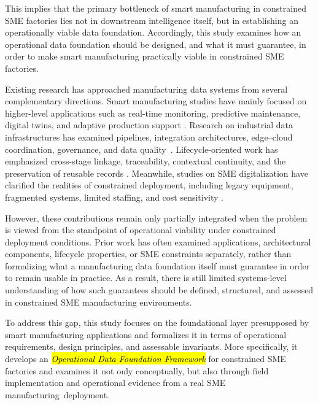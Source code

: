\documentclass[systems,article,accept,pdftex,moreauthors]{Definitions/mdpi}
\begin{document}
This implies that the primary bottleneck of smart manufacturing in constrained SME factories lies not in downstream intelligence itself, but in establishing an operationally viable data foundation. Accordingly, this study examines how an operational data foundation should be designed, and what it must guarantee, in order to make smart manufacturing practically viable in constrained SME factories.

Existing research has approached manufacturing data systems from several complementary directions. Smart manufacturing studies have mainly focused on higher-level applications such as real-time monitoring, predictive maintenance, digital twins, and adaptive production support \cite{song2025smart,tao2017digital,nguyen2025aidriven}. Research on industrial data infrastructures has examined pipelines, integration architectures, edge--cloud coordination, governance, and data \mbox{quality \cite{ismail2019manufacturing,raptis2019data,morris2020foundations}}. Lifecycle-oriented work has emphasized cross-stage linkage, traceability, contextual continuity, and the preservation of reusable records \cite{bernstein2018contextualising,hedberg2017lift,abdelaty2024conceptualizing,zhang2024digitalthread}. Meanwhile, studies on SME digitalization have clarified the realities of constrained deployment, including legacy equipment, fragmented systems, limited staffing, and cost sensitivity \cite{mittal2020adoption,ghobakhloo2019adoption,krishnan2024challenges,huang2025barriers}.

However, these contributions remain only partially integrated when the problem is viewed from the standpoint of operational viability under constrained deployment conditions. Prior work has often examined applications, architectural components, lifecycle properties, or SME constraints separately, rather than formalizing what a manufacturing data foundation itself must guarantee in order to remain usable in practice. As a result, there is still limited systems-level understanding of how such guarantees should be defined, structured, and assessed in constrained SME manufacturing environments.

To address this gap, this study focuses on the foundational layer presupposed by smart manufacturing applications and formalizes it in terms of operational requirements, design principles, and assessable invariants. More specifically, it develops an \emph{\hl{Operational Data Foundation Framework}} for constrained SME factories and examines it not only conceptually, but also through field implementation and operational evidence from a real SME \mbox{manufacturing deployment}.
\end{document}
